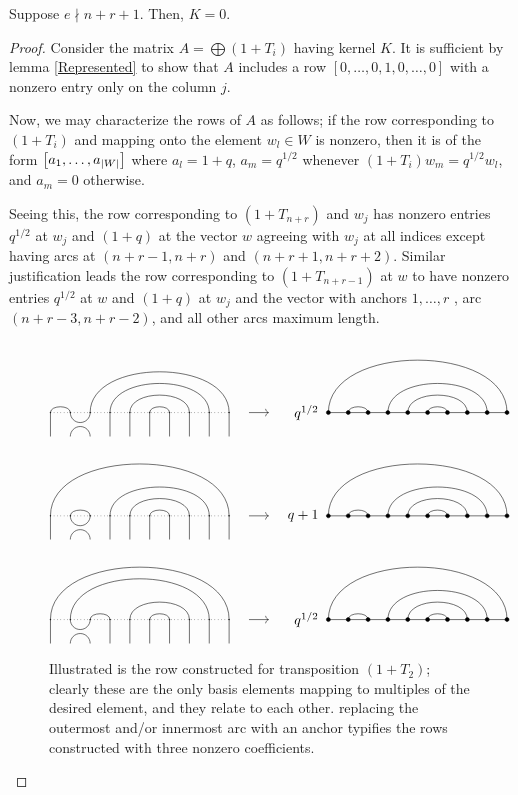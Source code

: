 \documentclass{amsart}
\begin{document}
\begin{lemma}\label{Trivial}
  Suppose $e \nmid n + r + 1$.
  Then, $K = 0$.
\end{lemma}
\begin{proof}
  Consider the matrix $A = \bigoplus (1 + T_i)$ having kernel $K$.
  It is sufficient by lemma \ref{Represented} to show that $A$ includes a row $[0,\dots,0,1,0,\dots,0]$ with a nonzero entry only on the column $j$.

  Now, we may characterize the rows of $A$ as follows;
  if the row corresponding to $(1 + T_i)$ and mapping onto the element $w_l \in W$ is nonzero, then it is of the form $\left[ a_1,\dots,a_{\left| W \right|} \right]$ where $a_l = 1 + q$, $a_m = q^{1/2}$ whenever $(1 + T_i)w_m = q^{1/2}w_l$, and $a_m = 0$ otherwise.
  
  Seeing this, the row corresponding to $(1 + T_{n + r})$ and $w_j$ has nonzero entries $q^{1/2}$ at $w_j$ and $(1 + q)$ at the vector $w$ agreeing with $w_j$ at all indices except having arcs at $(n+r-1,n+r)$ and $(n+r+1,n+r+2)$.
  Similar justification leads the row corresponding to $(1 + T_{n+r-1})$ at $w$ to have nonzero entries $q^{1/2}$ at $w$ and $(1 + q)$ at $w_j$ and the vector with anchors $1,\dots,r$ , arc $(n+r-3,n+r-2)$, and all other arcs maximum length.
  
  \begin{figure}
   \[
     \Action{10}{1/2,3/10,4/9,5/8,6/7}{2}{1/10,2/3,4/9,5/8,6/7}{q^{1/2}}
   \]
   \[
     \Action{10}{1/10,2/3,4/9,5/8,6/7}{2}{1/10,2/3,4/9,5/8,6/7}{q+1}
   \]
   \[
     \Action{10}{1/10,2/9,3/4,5/8,6/7}{2}{1/10,2/3,4/9,5/8,6/7}{q^{1/2}}
   \]
   \caption{Illustrated is the row constructed for transposition $(1 + T_2)$; clearly these are the only basis elements mapping to multiples of the desired element, and they relate to each other.
     replacing the outermost and/or innermost arc with an anchor typifies the rows constructed with three nonzero coefficients.}
 \label{Submatrix}
\end{figure}
 

\end{proof}
\end{document}
